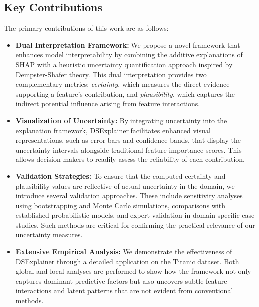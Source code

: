 \documentclass[acmlarge]{acmart}
\begin{document}
\subsection{Key Contributions}
The primary contributions of this work are as follows:
\begin{itemize}
    \item \textbf{Dual Interpretation Framework:} We propose a novel framework that enhances model interpretability by combining the additive explanations of SHAP with a heuristic uncertainty quantification approach inspired by Dempster-Shafer theory. This dual interpretation provides two complementary metrics: \textit{certainty}, which measures the direct evidence supporting a feature's contribution, and \textit{plausibility}, which captures the indirect potential influence arising from feature interactions.

    \item \textbf{Visualization of Uncertainty:} By integrating uncertainty into the explanation framework, DSExplainer facilitates enhanced visual representations, such as error bars and confidence bands, that display the uncertainty intervals alongside traditional feature importance scores. This allows decision-makers to readily assess the reliability of each contribution.
    \item \textbf{Validation Strategies:} To ensure that the computed certainty and plausibility values are reflective of actual uncertainty in the domain, we introduce several validation approaches. These include sensitivity analyses using bootstrapping and Monte Carlo simulations, comparisons with established probabilistic models, and expert validation in domain-specific case studies. Such methods are critical for confirming the practical relevance of our uncertainty measures.
    \item \textbf{Extensive Empirical Analysis:} We demonstrate the effectiveness of DSExplainer through a detailed application on the Titanic dataset. Both global and local analyses are performed to show how the framework not only captures dominant predictive factors but also uncovers subtle feature interactions and latent patterns that are not evident from conventional methods.
\end{itemize}
\end{document}
